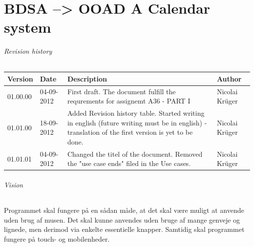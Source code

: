 \documentclass{article}
\begin{document}
  
  \part*{BDSA --> OOAD \linebreak A Calendar system}
  
  \paragraph{Revision history} \mbox{}  
  
  \begin{table}[ht]
    \begin{tabular}{|p{35pt}|p{50pt}|p{150pt}|p{75pt}|}
        \hline
        Version & Date &
        Description & 
        Author         
        \\ \hline
        01.00.00 & 04-09-2012 & 
        First draft. The document fulfill the requrements for assignemt A36 - PART I &
        Nicolai Krüger 
        \\ \hline        
        01.01.00 & 18-09-2012 & 
        Added Revision history table. Started writing in english (future writing must be in english) - translation of the first version is yet to be done. & 
        Nicolai Krüger              
        \\ \hline
        01.01.01 & 04-09-2012 &
        Changed the titel of the document. \linebreak
        Removed the "use case ends" filed in the Use cases. &
        Nicolai Krüger
        \\ \hline
    \end{tabular}
\end{table}
  
  \paragraph{Vision} \mbox{} 
  
  Programmet skal fungere på en sådan måde, at det skal være muligt at anvende uden brug af musen. Det skal kunne anvendes uden bruge af mange genveje og lignede, men derimod via enkelte essentielle knapper. 
Samtidig skal programmet fungere på touch- og mobilenheder.
  
\end{document}

